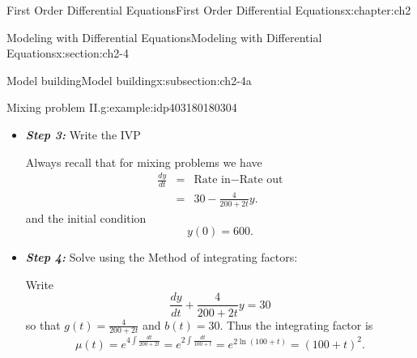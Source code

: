 \documentclass[oneside,10pt,]{book}
\newcommand{\alert}[1]{\textbf{\textit{#1}}}
\numberwithin{equation}{section}
\numberwithin{equation}{section}
\newcommand{\amp}{&}
\begin{document}
\begin{chapterptx}{First Order Differential Equations}{}{First Order Differential Equations}{}{}{x:chapter:ch2}
\begin{sectionptx}{Modeling with Differential Equations}{}{Modeling with Differential Equations}{}{}{x:section:ch2-4}
\begin{subsectionptx}{Model building}{}{Model building}{}{}{x:subsection:ch2-4a}
\begin{example}{Mixing problem II.}{g:example:idp403180180304}
\begin{itemize}[label=\textbullet]
\begin{equation*}
\end{equation*}
%
\par
We have%
\begin{align*}
\text{Rate in}\amp = \amp \underset{\mbox{-sugar water solution}}{\left(5\frac{\mbox{pounds}}{\mbox{gallon}}\right)\left(6\frac{\mbox{gallons}}{\mbox{min}}\right)}\\
\amp = \amp 30\frac{\mbox{pounds}}{\mbox{gallon}}.
\end{align*}
%
\par
To find the concentration of sugar coming out we have know the amount of water at time \(t\).%
\begin{align*}
\mbox{Water at time }t \amp = \amp 200\mbox{ gallons}+\left(6\frac{\mbox{gallons}}{\mbox{min}}-4\frac{\mbox{gallons}}{\mbox{min}}\right)t\\
\amp = \amp 200+2t,
\end{align*}
So%
\begin{align*}
\mbox{Rate out} \amp = \amp \left(\begin{array}{c}
\mbox{concentration}\\
\mbox{of stuff going out}
\end{array}\right)\times\mbox{Rate}\\
\amp = \amp \left(\frac{y(t)}{200+2t}\frac{\text{pounds}}{\text{gallon}}\right)\times4\frac{\mbox{gallons}}{\mbox{min}}.\\
\amp = \amp 4\frac{y(t)}{200+2t}\frac{\text{pound}}{\text{min}}.
\end{align*}
%
\item{}\alert{Step 3:} Write the IVP%
\par
Always recall that for mixing problems we have%
\begin{align*}
\frac{dy}{dt} \amp = \amp \mbox{Rate in}-\mbox{Rate out}\\
\amp = \amp 30-\frac{4}{200+2t}y.
\end{align*}
and the initial condition%
\begin{equation*}
y(0)=600.
\end{equation*}
%
\item{}\alert{Step 4:} Solve using the Method of integrating factors:%
\par
Write%
\begin{equation*}
\frac{dy}{dt}+\frac{4}{200+2t}y=30
\end{equation*}
so that \(g(t)=\frac{4}{200+2t}\) and \(b(t)=30\). Thus the integrating factor is%
\begin{equation*}
\mu(t)=e^{4\int\frac{dt}{200+2t}}=e^{2\int\frac{dt}{100+t}}=e^{2\ln\left(100+t\right)}=\left(100+t\right)^{2}.

\end{equation*}
\end{itemize}
\end{example}
\end{subsectionptx}
\end{sectionptx}
\end{chapterptx}
\end{document}

